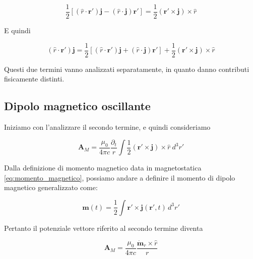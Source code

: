 \begin{equation}
    \frac{1}{2}\left[(\hat{r} \cdot \mathbf{r'}) \mathbf{j} - (\hat{r} \cdot \mathbf{j}) \mathbf{r'}\right] = \frac{1}{2}(\mathbf{r'} \times \mathbf{j}) \times \hat{r}
\end{equation}

E quindi 

\begin{equation}
     (\hat{r} \cdot \mathbf{r'}) \mathbf{j} = \frac{1}{2}\left[(\hat{r} \cdot \mathbf{r'}) \mathbf{j} + (\hat{r} \cdot \mathbf{j}) \mathbf{r'}\right] + \frac{1}{2}(\mathbf{r'} \times \mathbf{j}) \times \hat{r}
\end{equation}

Questi due termini vanno analizzati separatamente, in quanto danno contributi fisicamente distinti.

\subsection{Dipolo magnetico oscillante}

Iniziamo con l'analizzare il secondo termine, e quindi consideriamo 

\begin{equation}
    \mathbf{A}_{M} = \frac{\mu_0}{4 \pi c} \frac{\partial_t}{r} \int \frac{1}{2} (\mathbf{r}' \times \mathbf{j}) \times \hat{r} \ d^3 r'
\end{equation}

Dalla definizione di momento magnetico data in magnetostatica \eqref{eq:momento_magnetico}, possiamo andare a definire il momento di dipolo magnetico generalizzato come:

\begin{tcolorbox}[colback=yellow!10!white, colframe=orange!70!black, boxrule=0.8pt]
\begin{equation}
    \mathbf{m}(t) = \frac{1}{2} \int \mathbf{r}' \times \mathbf{j}(\mathbf{r}', t) \, d^3r'
\end{equation}
\end{tcolorbox}

\newpage 

Pertanto il potenziale vettore riferito al secondo termine diventa 

\begin{tcolorbox}[colback=yellow!10!white, colframe=orange!70!black, boxrule=0.8pt]
\begin{equation}
    \mathbf{A}_{M} = \frac{\mu_0}{4 \pi c} \frac{\dot{\mathbf{m}}_r \times \hat{r}}{r}
\end{equation}
\end{tcolorbox}

